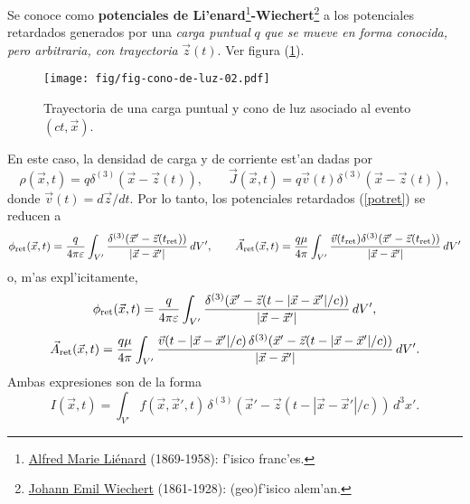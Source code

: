 Se conoce como \textbf{potenciales de Li'enard}\footnote{\href{https://en.wikipedia.org/wiki/Alfred-Marie_Li\%C3\%A9nard}{Alfred Marie Li\'enard} (1869-1958): f'isico franc'es.}\textbf{-Wiechert}\footnote{\href{https://en.wikipedia.org/wiki/Emil_Wiechert}{Johann Emil Wiechert} (1861-1928): (geo)f'isico alem'an.} a los potenciales retardados generados por una \textit{carga puntual} $q$ \textit{que se mueve en forma conocida, pero arbitraria, con trayectoria} $\vec{z}(t)$. Ver figura (\ref{fig:LW}).
\begin{figure}[ht]
\centerline{\texttt{[image: fig/fig-cono-de-luz-02.pdf]}}
\caption{Trayectoria de una carga puntual y cono de luz asociado al evento $(ct,\vec{x})$.}
\label{fig:LW}
\end{figure}
En este caso, la densidad de carga y de corriente est'an dadas por
\begin{equation}
\rho(\vec{x},t)=q\delta^{(3)}(\vec{x}-\vec{z}(t)), \qquad
\vec{J}(\vec{x},t)=q\vec{v}(t)\delta^{(3)}(\vec{x}-\vec{z}(t)),
\end{equation}
donde $\vec{v}(t)={d\vec{z}}/{dt}$. Por lo tanto, los potenciales retardados (\ref{potret}) se reducen a
\begin{equation}
\phi_{\rm ret}(\vec{x},t)=\frac{q}{4\pi\varepsilon}\int_{V'}
\frac{\delta^{(3)}(\vec{x}'-\vec{z}(t_{\rm ret}))}{|\vec{x}-\vec{x}'|}\,dV', \qquad
\vec{A}_{\rm ret}(\vec{x},t)=\frac{q\mu}{4\pi}\int_{V'}
\frac{\vec{v}(t_{\rm ret})\delta^{(3)}(\vec{x}'-\vec{z}(t_{\rm ret}))}{|\vec{x}-\vec{x}'|}\,dV'  \label{potretq1}
\end{equation}
o, m'as expl'icitamente,
\begin{equation}
\phi_{\rm ret}(\vec{x},t)=\frac{q}{4\pi\varepsilon}\int_{V'}
\frac{\delta^{(3)}(\vec{x}'-\vec{z}(t-|\vec{x}-\vec{x}'|/c))}{|\vec{x}-\vec{x}'|}\,dV', \end{equation}
\begin{equation}
\vec{A}_{\rm ret}(\vec{x},t)=\frac{q\mu}{4\pi}\int_{V'}
\frac{\vec{v}(t-|\vec{x}-\vec{x}'|/c)\,\delta^{(3)}(\vec{x}'-\vec{z}(t-|\vec{x}-\vec{x}'|/c))}{|\vec{x}-\vec{x}'|}\,dV' . \label{potretq2}
\end{equation}
Ambas expresiones son de la forma
\begin{equation}
I(\vec{x},t)=\int_{V'}
f(\vec{x},\vec{x}',t)\,\delta^{(3)}(\vec{x}'-\vec{z}(t-|\vec{x}-\vec{x}'|/c))\,d^3x' . \label{potretqg1}
\end{equation}

